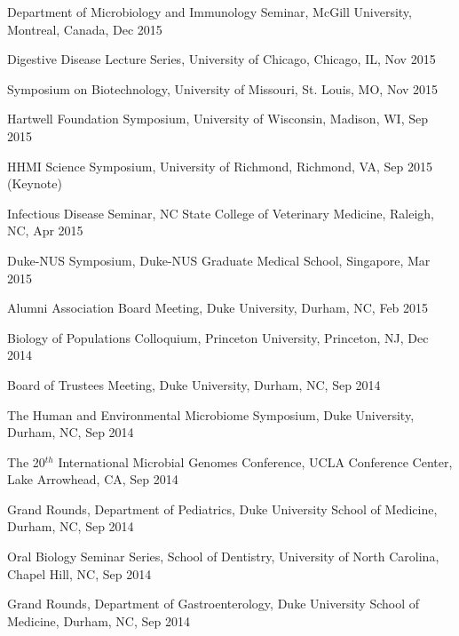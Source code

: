 \documentclass[overlapped,line,11pt]{res}
\begin{document}
\begin{resume}
\begin{revnumerate}[58]
\item {Department of Microbiology and Immunology Seminar, McGill University, Montreal, Canada, Dec 2015}

\item {Digestive Disease Lecture Series, University of Chicago, Chicago, IL, Nov 2015}

\item {Symposium on Biotechnology, University of Missouri, St. Louis, MO, Nov 2015}

\item {Hartwell Foundation Symposium, University of Wisconsin, Madison, WI, Sep 2015}

\item {HHMI Science Symposium, University of Richmond, Richmond, VA, Sep 2015 (Keynote)}

\item {Infectious Disease Seminar, NC State College of Veterinary Medicine, Raleigh, NC, Apr 2015}

\item {Duke-NUS Symposium, Duke-NUS Graduate Medical School, Singapore, Mar 2015}

\item {Alumni Association Board Meeting, Duke University,
  Durham, NC, Feb 2015
  }

\item {Biology of Populations Colloquium, Princeton University, Princeton, NJ, Dec 2014
  }

\item {Board of Trustees Meeting, Duke University,
  Durham, NC, Sep 2014
  }

\item { The Human and Environmental Microbiome Symposium, Duke University,
  Durham, NC, Sep 2014
  }

\item {The 20$^{th}$ International Microbial Genomes Conference, UCLA
  Conference Center, Lake Arrowhead, CA, Sep 2014
  }

\item {Grand Rounds, Department of Pediatrics, Duke University School of
  Medicine, Durham, NC, Sep 2014
  }

\item {Oral Biology Seminar Series, School of Dentistry, University of
  North Carolina, Chapel Hill, NC, Sep 2014
  }

\item {Grand Rounds, Department of Gastroenterology, Duke University School of
  Medicine, Durham, NC, Sep 2014
  }


\end{revnumerate}
\end{resume}
\end{document}
